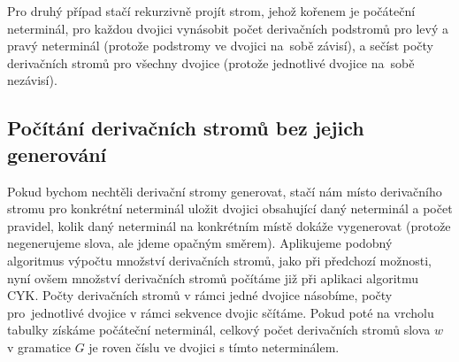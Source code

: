 \documentclass{article}
\begin{document}
Pro druhý případ stačí rekurzivně projít strom, jehož kořenem je počáteční
neterminál, pro každou dvojici vynásobit počet derivačních podstromů pro
levý a pravý neterminál (protože podstromy ve dvojici na~sobě závisí),
a sečíst počty derivačních stromů pro všechny dvojice (protože
jednotlivé dvojice na~sobě nezávisí).

\subsection{Počítání derivačních stromů bez jejich generování}

Pokud bychom nechtěli derivační stromy generovat, stačí nám místo
derivačního stromu pro konkrétní neterminál uložit dvojici obsahující
daný neterminál a počet pravidel, kolik daný neterminál na konkrétním místě
dokáže vygenerovat (protože negenerujeme slova, ale jdeme opačným směrem).
Aplikujeme podobný algoritmus výpočtu množství derivačních stromů, jako
při předchozí možnosti, nyní ovšem množství derivačních stromů počítáme
již při aplikaci algoritmu CYK. Počty derivačních stromů v rámci jedné
dvojice násobíme, počty pro~jednotlivé dvojice v rámci sekvence dvojic
sčítáme. Pokud poté na vrcholu tabulky získáme počáteční neterminál,
celkový počet derivačních stromů slova $w$ v gramatice $G$ je roven
číslu ve dvojici s tímto neterminálem.
\end{document}
